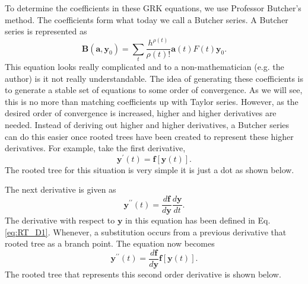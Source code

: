 \documentclass{ansconf}
\numberwithin{equation}{section}
\begin{document}
To determine the coefficients in these GRK equations, we use Professor Butcher's method. The coefficients form what today we call a Butcher series. A Butcher series is represented as
\begin{equation}    
    \mathbf{B}\left(\mathbf{a}, \mathbf{y}_0\right) = \sum_t \frac{h^{\rho\left(t\right)}}{\rho\left(t\right)!}\mathbf{a}\left(t\right)F\left(t\right)\mathbf{y}_0.
\end{equation}
This equation looks really complicated and to a non-mathematician (e.g. the author) is it not really understandable. The idea of generating these coefficients is to generate a stable set of equations to some order of convergence. As we will see, this is no more than matching coefficients up with Taylor series. However, as the desired order of convergence is increased, higher and higher derivatives are needed. Instead of deriving out higher and higher derivatives, a Butcher series can do this easier once rooted trees have been created to represent these higher derivatives. For example, take the first derivative,
\begin{equation} \label{eq:RT_D1}
\mathbf{y}^\prime\left(t\right) = \mathbf{f}\left[\mathbf{y}\left(t\right)\right].
\end{equation}
The rooted tree for this situation is very simple it is just a dot as shown below.\\
\begin{center}\end{center}
The next derivative is given as
\begin{equation}
    \mathbf{y}^{\prime\prime}\left(t\right) = \frac{d\mathbf{f}}{d\mathbf{y}}\frac{d\mathbf{y}}{dt}.
\end{equation}
The derivative with respect to $\mathbf{y}$ in this equation has been defined in Eq. \eqref{eq:RT_D1}. Whenever, a substitution occurs from a previous derivative that rooted tree as a branch point. The equation now becomes
\begin{equation}\label{eq:RT_D2}
    \mathbf{y}^{\prime\prime}\left(t\right) = \frac{d\mathbf{f}}{d\mathbf{y}}\mathbf{f}\left[\mathbf{y}\left(t\right)\right].
\end{equation}
The rooted tree that represents this second order derivative is shown below. \\
\begin{center}\end{center}
\end{document}
